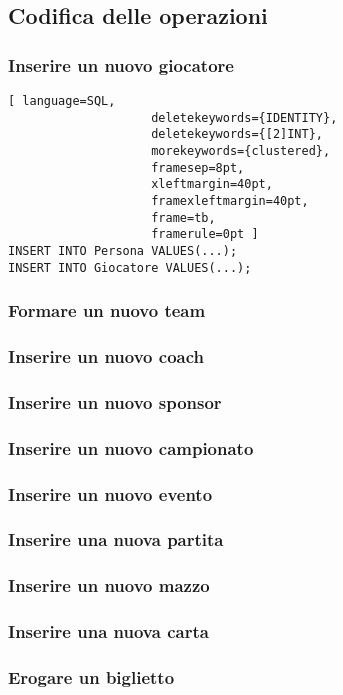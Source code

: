\documentclass{article}
\begin{document}
\subsection{Codifica delle operazioni}

\subsubsection{Inserire un nuovo giocatore}
\begin{lstlisting}[ language=SQL,
                    deletekeywords={IDENTITY},
                    deletekeywords={[2]INT},
                    morekeywords={clustered},
                    framesep=8pt,
                    xleftmargin=40pt,
                    framexleftmargin=40pt,
                    frame=tb,
                    framerule=0pt ]
INSERT INTO Persona VALUES(...);
INSERT INTO Giocatore VALUES(...);
\end{lstlisting}
\subsubsection{Formare un nuovo team}
\subsubsection{Inserire un nuovo coach}
\subsubsection{Inserire un nuovo sponsor}
\subsubsection{Inserire un nuovo campionato}
\subsubsection{Inserire un nuovo evento}
\subsubsection{Inserire una nuova partita}
\subsubsection{Inserire un nuovo mazzo}
\subsubsection{Inserire una nuova carta}
\subsubsection{Erogare un biglietto}
\end{document}
